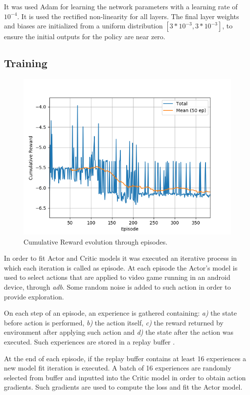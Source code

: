 \documentclass[peerreview,onecolumn]{IEEEtran}
\begin{document}
	 It was used Adam \cite{adam_2014} for learning the network parameters with a learning rate of $10^{-4}$. It is used the rectified non-linearity \cite{relu_2011} for all layers. The final layer weights and biases are initialized from a uniform distribution $[3 * 10^{-3}, 3 * 10^{-3}]$, to ensure the initial outputs for the policy are near zero.
	 
	 \subsection{Training}
	 
	  \begin{figure}[!h]
		\centering
		\includegraphics[width=0.9\columnwidth]{img/cumulative_reward.png} 
		\caption{Cumulative Reward evolution through episodes.}
		\label{fig:reward}
	\end{figure}
	
	 In order to fit Actor and Critic models it was executed an iterative process in which each iteration is called as episode. At each episode the Actor's model is used to select actions that are applied to video game running in an android device, through \textit{adb}. Some random noise is added to such action in order to provide exploration. 
	 
	 On each step of an episode, an experience is gathered containing: \textit{a)} the state before action is performed, \textit{b)} the action itself, \textit{c)} the reward returned by environment after applying such action and \textit{d)} the state after the action was executed. Such experiences are stored in a replay buffer \cite{rep_buffer}.
	 
	  At the end of each episode, if the replay buffer contains at least 16 experiences a new model fit iteration is executed. A batch of 16 experiences are randomly selected from buffer and inputted into the Critic model in order to obtain action gradients. Such gradients are used to compute the loss and fit the Actor model.
	  
\end{document}
